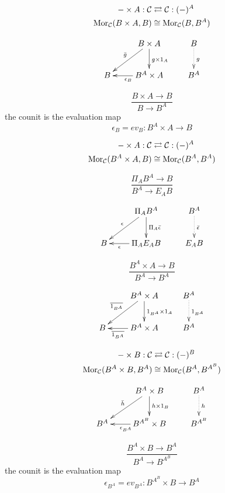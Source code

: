 \documentclass[aps,twocolumn]{revtex4-1}
\begin{document}
\begin{align*}
- \times A: \mathcal{C} & \rightleftarrows \mathcal{C}: (-)^A\\
\mathop{\rm Mor}\nolimits_{\mathcal{C}}(B \times A, B) & \cong  \mathop{\rm Mor}\nolimits_{\mathcal{C}}(B, B^A)
\end{align*}

			$$
			\xymatrix{
			& B \times A \ar[d]^{g \times 1_A} \ar[dl]_{\bar{g}} & B \ar@{.>}[d]^{g}\\
			B & B^A \times A \ar[l]^{\epsilon_B} & B^A}
			$$
	
		$$
			\frac{B \times A \longrightarrow B}{B \longrightarrow B^A}
		$$
		the counit is the evaluation map
		$$
			\epsilon_B = ev_B \colon B^A \times A \longrightarrow B
		$$
	
\begin{align*}
- \times A: \mathcal{C} & \rightleftarrows \mathcal{C}: (-)^A\\
\mathop{\rm Mor}\nolimits_{\mathcal{C}}(B^A \times A, B) & \cong  \mathop{\rm Mor}\nolimits_{\mathcal{C}}(B^A, B^A)
\end{align*}

		$$
			\frac{ \Pi_A B^A \longrightarrow B}{B^A \longrightarrow E_A B}
		$$

			$$
			\xymatrix{
			& \Pi_A B^A \ar[d]^{\Pi_A \bar{\epsilon}} \ar[dl]_{\epsilon} & B^A \ar@{.>}[d]^{\bar{\epsilon}}\\
			B & \Pi_A E_A B \ar[l]^-{\epsilon} & E_A B}
			$$
	
		$$
			\frac{B^A \times A \longrightarrow B}{B^A \longrightarrow B^A}
		$$
		
			$$
			\xymatrix{
			& B^A \times A \ar[d]^{1_{B^A} \times 1_A} \ar[dl]_{\overline{1_{B^A}}} & B^A \ar@{.>}[d]^{1_{B^A}}\\
			B & B^A \times A \ar[l]^-{\overline{1_{B^A}}} & B^A}
			$$

\begin{align*}
- \times B: \mathcal{C} & \rightleftarrows \mathcal{C}: (-)^B\\
\mathop{\rm Mor}\nolimits_{\mathcal{C}}(B^A \times B, B^A) & \cong  \mathop{\rm Mor}\nolimits_{\mathcal{C}}(B^A, B^{A^B})
\end{align*}

			$$ \xymatrix{
			& B^A \times B \ar[d]^-{h \times 1_B} \ar[dl]_{\bar{h}} & B^A \ar@{.>}[d]^-{h}\\
			B^A & B^{A^B} \times B \ar[l]^{\epsilon_{B^A}} & B^{A^B}}
			$$
		
		$$
			\frac{B^A \times B \longrightarrow B^A}{B^A \longrightarrow B^{A^B}}
		$$
		the counit is the evaluation map
		$$
			\epsilon_{B^A} = ev_{B^A} \colon B^{A^B} \times B \longrightarrow B^A
		$$
\end{document}
